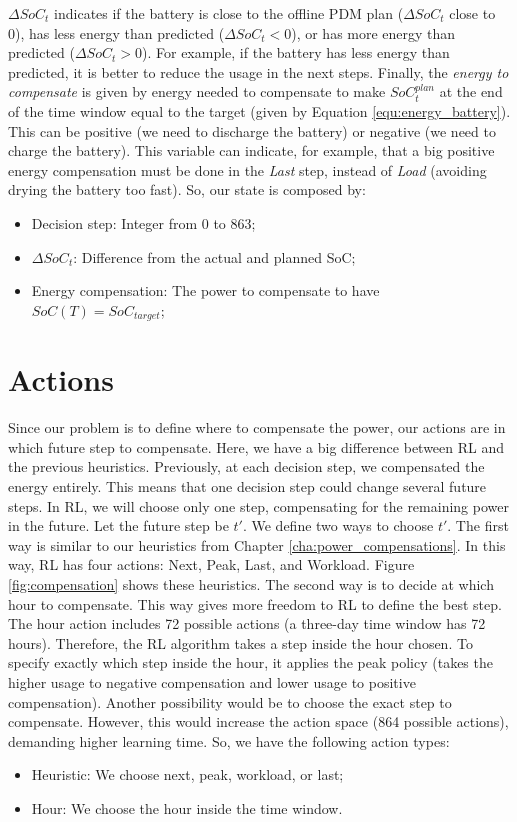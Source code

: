 $\Delta SoC_t$ indicates if the battery is close to the offline PDM plan ($\Delta SoC_t$ close to 0), has less energy than predicted ($\Delta SoC_t < 0$), or has more energy than predicted ($\Delta SoC_t > 0$). For example, if the battery has less energy than predicted, it is better to reduce the usage in the next steps. Finally, the \textit{energy to compensate} is given by energy needed to compensate to make $SoC^{plan}_{t}$ at the end of the time window equal to the target (given by Equation \ref{equ:energy_battery}). This can be positive (we need to discharge the battery) or negative (we need to charge the battery). This variable can indicate, for example, that a big positive energy compensation must be done in the \emph{Last} step, instead of \emph{Load} (avoiding drying the battery too fast). So, our state is composed by:

\begin{itemize}
    \item Decision step: Integer from 0 to 863;
    \item \(\Delta SoC_t\): Difference from the actual and planned SoC;
    \item Energy compensation: The power to compensate to have $SoC(T) = SoC_{target}$;
\end{itemize}

\section{Actions}

Since our problem is to define where to compensate the power, our actions are in which future step to compensate. Here, we have a big difference between RL and the previous heuristics. Previously, at each decision step, we compensated the energy entirely. This means that one decision step could change several future steps. In RL, we will choose only one step, compensating for the remaining power in the future. Let the future step be $t'$. We define two ways to choose $t'$. The first way is similar to our heuristics from Chapter \ref{cha:power_compensations}. In this way, RL has four actions: Next, Peak, Last, and Workload. Figure \ref{fig:compensation} shows these heuristics. The second way is to decide at which hour to compensate. This way gives more freedom to RL to define the best step. The hour action includes 72 possible actions (a three-day time window has 72 hours). Therefore, the RL algorithm takes a step inside the hour chosen. To specify exactly which step inside the hour, it applies the peak policy (takes the higher usage to negative compensation and lower usage to positive compensation). Another possibility would be to choose the exact step to compensate. However, this would increase the action space (864 possible actions), demanding higher learning time. So, we have the following action types:
\begin{itemize}
    \item Heuristic: We choose next, peak, workload, or last;
    \item Hour: We choose the hour inside the time window.
\end{itemize}

